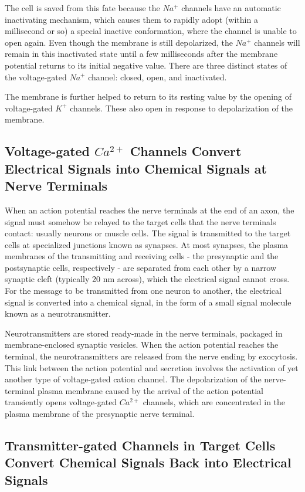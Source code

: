 The cell is saved from this fate because the $Na^{+}$ channels have an automatic
inactivating mechanism, which causes them to rapidly adopt
(within a millisecond or so) a special inactive conformation, where the
channel is unable to open again. Even though the membrane is still depolarized,
the $Na^{+}$ channels will remain in this inactivated state until a few
milliseconds after the membrane potential returns to its initial negative
value. There are three distinct states of the voltage-gated
$Na^{+}$ channel: closed, open, and inactivated.

The membrane is further helped to return to its resting value by the opening
of voltage-gated $K^{+}$ channels. These also open in response to depolarization
of the membrane.

\subsection{Voltage-gated $Ca^{2+}$ Channels Convert Electrical Signals into Chemical Signals at Nerve Terminals}

When an action potential reaches the nerve terminals at the end of an
axon, the signal must somehow be relayed to the target cells that the
nerve terminals contact: usually neurons or muscle cells. The signal is
transmitted to the target cells at specialized junctions known as synapses.
At most synapses, the plasma membranes of the transmitting and
receiving cells - the presynaptic and the postsynaptic cells, respectively -
are separated from each other by a narrow synaptic cleft (typically 20 nm
across), which the electrical signal cannot cross. For the
message to be transmitted from one neuron to another, the electrical
signal is converted into a chemical signal, in the form of a small signal
molecule known as a neurotransmitter.

Neurotransmitters are stored ready-made in the nerve terminals, packaged
in membrane-enclosed synaptic vesicles.
When the action potential reaches the terminal, the neurotransmitters
are released from the nerve ending by exocytosis. This link between the
action potential and secretion involves the
activation of yet another type of voltage-gated cation channel. The
depolarization of the nerve-terminal plasma membrane caused by the
arrival of the action potential transiently opens voltage-gated $Ca^{2+}$ channels,
which are concentrated in the plasma membrane of the presynaptic nerve terminal.

\subsection{Transmitter-gated Channels in Target Cells Convert Chemical Signals Back into Electrical Signals}

